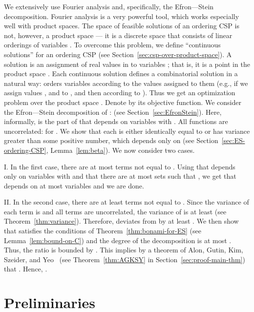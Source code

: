 \documentclass[11pt]{article}
\begin{document}
We extensively use Fourier analysis and, specifically, the Efron---Stein decomposition. Fourier analysis is a very powerful tool, which works especially well with product spaces. The space of feasible solutions of an ordering CSP is not, however, a product space --- it is a discrete space
that consists of  linear orderings of variables . To overcome this problem, we define ``continuous solutions'' for an ordering
CSP (see Section~\ref{sec:csp-over-product-space}). A solution  is an assignment of real values in  to variables ; that is, it is a point in the product space . Each continuous solution defines a combinatorial solution  in a natural way:  orders variables  according to the values assigned to them (e.g., if we assign values ,  and  to ,  and  then  according to ). Thus we get an optimization problem over the product space .
Denote by  its objective function.
We consider the Efron---Stein decomposition of :  (see Section~\ref{sec:EfronStein}). Here, informally,  is the part of  that depends on variables  with . All functions  are uncorrelated:  for . We show that each  is either identically equal to  or has variance greater than some positive number, which depends only on  (see Section~\ref{sec:ES-ordering-CSP}, Lemma~\ref{lem:beta}).
We now consider two cases.

I. In the first case, there are at most   terms   not equal to . Using that  depends only on variables  with  and that there are at most  sets  such that , we get that  depends on at most  variables and we are done.

II. In the second case, there are at least   terms   not equal to . Since the variance of each term  is  and all terms  are uncorrelated, the variance of  is at least  (see Theorem~\ref{thm:variance}). Therefore,  deviates from  by at least . We then show that  satisfies the conditions of Theorem~\ref{thm:bonami-for-ES} (see Lemma~\ref{lem:bound-on-C}) and the degree of the decomposition is at most .
Thus, the ratio  is bounded by . This implies by a theorem of Alon, Gutin, Kim, Szeider, and Yeo~\cite{AGKSY} (see Theorem~\ref{thm:AGKSY} in Section~\ref{sec:proof-main-thm})
that . Hence, .

 



\section{Preliminaries}\label{sec:prelim}
\end{document}

